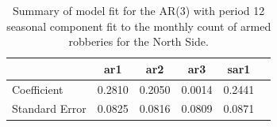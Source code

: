 \documentclass{article} %
\begin{document}
 
 \begin{table}[h]
	\label{tab:data}
	\begin{center}
	\begin{tabular}{lccccc}
			\hline
			&           ar1  &   ar2  & ar3 &   sar1    \\\hline
Coefficient   &   0.2810 &  0.2050 & 0.0014 & 0.2441  \\
Standard Error & 0.0825 & 0.0816 & 0.0809 & 0.0871 \\ 
		\end{tabular}
	\caption{Summary of model fit for the AR(3) with period 12 seasonal component fit to the monthly count of armed robberies for the North Side.}
	\end{center}
\end{table}

 \break
 \newpage
 
\end{document}
